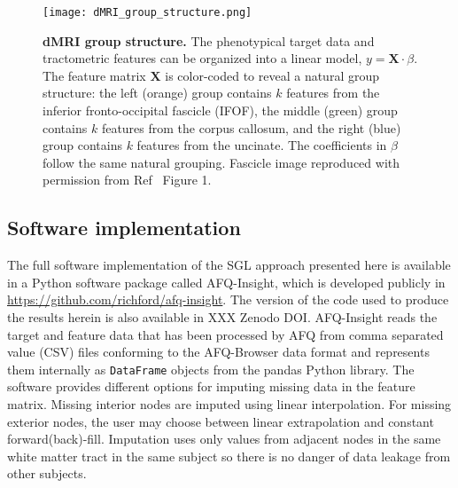 \begin{figure}[!h]
    \centering
    \texttt{[image: dMRI\_group\_structure.png]}
    \caption{{\bf dMRI group structure.}
        The phenotypical target data and tractometric features can be organized
    into a linear model, $y = \mathbf{X} \cdot \beta$. The feature matrix
    $\mathbf{X}$ is color-coded to reveal a natural group structure: the left
    (orange) group contains $k$ features from the inferior fronto-occipital
    fascicle (IFOF), the middle (green) group contains $k$ features from the
    corpus callosum, and the right (blue) group contains $k$ features from the
    uncinate. The coefficients in $\beta$ follow the same natural grouping.
    Fascicle image reproduced with permission from Ref~\cite{yeatman2012tract}
    Figure 1.}
    \label{fig:group-structure}
\end{figure}

\subsection*{Software implementation}

The full software implementation of the SGL approach presented here is available
in a Python software package called AFQ-Insight, which is developed publicly in
\url{https://github.com/richford/afq-insight}. The version of the code used to
produce the results herein is also available in XXX Zenodo DOI. AFQ-Insight
reads the target and feature data that has been processed by AFQ from comma
separated value (CSV) files conforming to the AFQ-Browser data
format\cite{yeatman2018browser} and represents them internally as
\lstinline{DataFrame} objects from the pandas Python
library\cite{mckinney2010data}. The software provides different options for
imputing missing data in the feature matrix. Missing interior nodes are imputed
using linear interpolation. For missing exterior nodes, the user may choose
between linear extrapolation and constant forward(back)-fill. Imputation uses
only values from adjacent nodes in the same white matter tract in the same
subject so there is no danger of data leakage from other subjects.